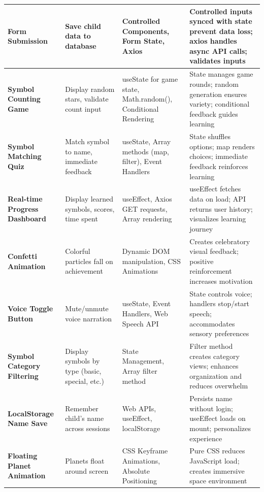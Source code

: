 \documentclass[12pt, a4paper]{article}
\begin{document}
\begin{longtable}{|>{\raggedright}p{3cm}|>{\raggedright}p{3.5cm}|>{\raggedright}p{3.5cm}|>{\raggedright\arraybackslash}p{4cm}|}
\textbf{Form Submission} & Save child data to database & Controlled Components, Form State, Axios & Controlled inputs synced with state prevent data loss; axios handles async API calls; validates inputs \\
\hline

\textbf{Symbol Counting Game} & Display random stars, validate count input & useState for game state, Math.random(), Conditional Rendering & State manages game rounds; random generation ensures variety; conditional feedback guides learning \\
\hline

\textbf{Symbol Matching Quiz} & Match symbol to name, immediate feedback & useState, Array methods (map, filter), Event Handlers & State shuffles options; map renders choices; immediate feedback reinforces learning \\
\hline

\textbf{Real-time Progress Dashboard} & Display learned symbols, scores, time spent & useEffect, Axios GET requests, Array rendering & useEffect fetches data on load; API returns user history; visualizes learning journey \\
\hline

\textbf{Confetti Animation} & Colorful particles fall on achievement & Dynamic DOM manipulation, CSS Animations & Creates celebratory visual feedback; positive reinforcement increases motivation \\
\hline

\textbf{Voice Toggle Button} & Mute/unmute voice narration & useState, Event Handlers, Web Speech API & State controls voice; handlers stop/start speech; accommodates sensory preferences \\
\hline

\textbf{Symbol Category Filtering} & Display symbols by type (basic, special, etc.) & State Management, Array filter method & Filter method creates category views; enhances organization and reduces overwhelm \\
\hline

\textbf{LocalStorage Name Save} & Remember child's name across sessions & Web APIs, useEffect, localStorage & Persists name without login; useEffect loads on mount; personalizes experience \\
\hline

\textbf{Floating Planet Animation} & Planets float around screen & CSS Keyframe Animations, Absolute Positioning & Pure CSS reduces JavaScript load; creates immersive space environment \\
\hline


\end{longtable}
\end{document}
